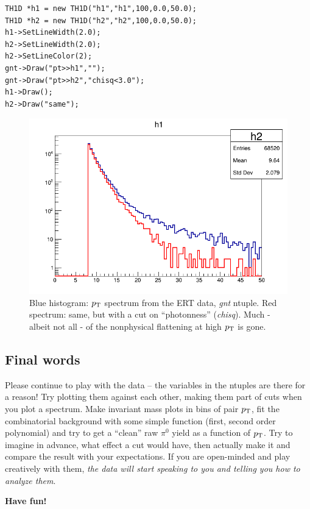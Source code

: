 \documentclass[pdftex,12pt,letter]{article}
\newcommand{\piz}{\mbox{$\pi^0$}\xspace}
\newcommand{\pt}{\mbox{$p_{\rm T}$}\xspace}
\begin{document}
\begin{lstlisting}
TH1D *h1 = new TH1D("h1","h1",100,0.0,50.0);
TH1D *h2 = new TH1D("h2","h2",100,0.0,50.0);
h1->SetLineWidth(2.0);
h2->SetLineWidth(2.0);
h2->SetLineColor(2);
gnt->Draw("pt>>h1","");
gnt->Draw("pt>>h2","chisq<3.0");
h1->Draw();
h2->Draw("same");
\end{lstlisting}


\begin{center}
\begin{figure}[htbp]
  \includegraphics[width=0.5\linewidth]{figs/ertgntpt}
  \caption{Blue histogram: \pt spectrum from the ERT data, 
    {\it gnt} ntuple.  Red spectrum: same, but with a cut on
    ``photonness'' ({\it chisq}).  Much - albeit not all - of the
    nonphysical flattening at high \pt is gone.
  }
  \label{fig:ertgntpt}
\end{figure}
\end{center}
\subsection{Final words}
Please continue to play with the data --  the variables in the ntuples
are there for a reason!  Try plotting them against each other, making
them part of cuts when you plot a spectrum.  Make invariant mass plots
in bins of pair \pt, fit the combinatorial background with some simple
function (first, second order polynomial) and try to get a ``clean''
raw \piz yield as a function of \pt.  Try to imagine in advance, what
effect a cut would have, then actually make it and compare the result
with your expectations.  If you are open-minded and play creatively
with them, {\it the data will start speaking to you and telling you
how to analyze them}.

\vspace{0.2in}

\noindent
{\bf Have fun!}
\end{document}
